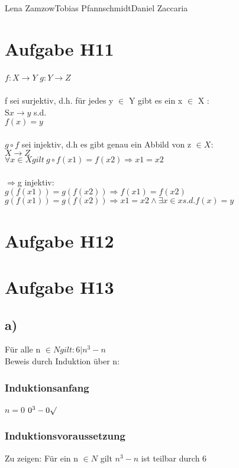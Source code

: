 \documentclass[11pt,a4paper]{article}
\begin{document}
                {Lena Zamzow}{Tobias Pfannschmidt}{Daniel Zaccaria}{}{}



\section*{Aufgabe H11}
$f:X \longrightarrow Y$ $ g:Y \longrightarrow Z$\\
\\
f sei surjektiv, d.h. für jedes y $\in $ Y gibt es ein x $\in$ X : \\
S$x \longrightarrow y$ s.d.\\
$f(x)=y$\\
\\
$g\circ f$ sei injektiv, d.h es gibt genau ein Abbild von z $ \in X: $\\
$ X \longrightarrow Z~ $\\
$\forall x \in X gilt~g \circ f(x1)=f(x2) \Rightarrow x1 = x2$\\ 
\\
$\Rightarrow $g injektiv:\\
$ g(f(x1)) = g(f(x2))\Rightarrow f(x1)=f(x2)$\\
$g(f(x1))=g(f(x2)) \Rightarrow x1=x2 \wedge \exists x \in x s.d. f(x)=y$\\ 


\section*{Aufgabe H12}

\section*{Aufgabe H13}

\subsection*{a)}
Für alle n $ \in N gilt: 6 |  n^3-n $ \\
Beweis durch Induktion über n:\\
\subsubsection*{Induktionsanfang}
$n=0$ $0^3-0 \surd$\\
\subsubsection*{Induktionsvoraussetzung}
Zu zeigen: Für ein n $\in N$ gilt $n^3-n$ ist teilbar durch 6\\
\end{document}
